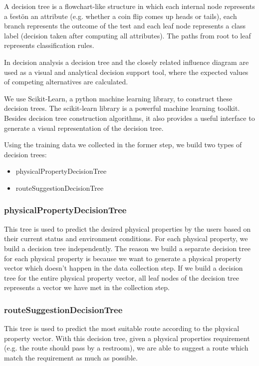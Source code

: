 \documentclass{sigchi}
\begin{document}
A decision tree is a flowchart-like structure in which each internal node represents a \"test\" on an attribute (e.g. whether a coin flip comes up heads or tails), each branch represents the outcome of the test and each leaf node represents a class label (decision taken after computing all attributes). The paths from root to leaf represents classification rules.


In decision analysis a decision tree and the closely related influence diagram are used as a visual and analytical decision support tool, where the expected values of competing alternatives are calculated.


We use Scikit-Learn, a python machine learning library, to construct these decision trees. The scikit-learn library is a powerful machine learning toolkit. Besides decision tree construction algorithms, it also provides a useful interface to generate a visual representation of the decision tree.


Using the training data we collected in the former step, we build two types of decision trees:
\begin{itemize}
\item physicalPropertyDecisionTree
\item routeSuggestionDecisionTree
\end{itemize}

\subsubsection{physicalPropertyDecisionTree}

This tree  is used to predict the desired physical properties by the users based on their current status and environment conditions. For each physical property, we build a decision tree independently. The reason we build a separate decision tree for each physical property is because we want to generate a physical property vector which doesn’t happen in the data collection step. If we build a decision tree for the entire physical property vector, all leaf nodes of the decision tree represents a vector we have met in the collection step.


\subsubsection{routeSuggestionDecisionTree}

This tree is used to predict the most suitable route according to the physical property vector. With this decision tree, given a physical properties requirement (e.g. the route should pass by a restroom), we are able to suggest a route which match the requirement as much as possible.
\end{document}
